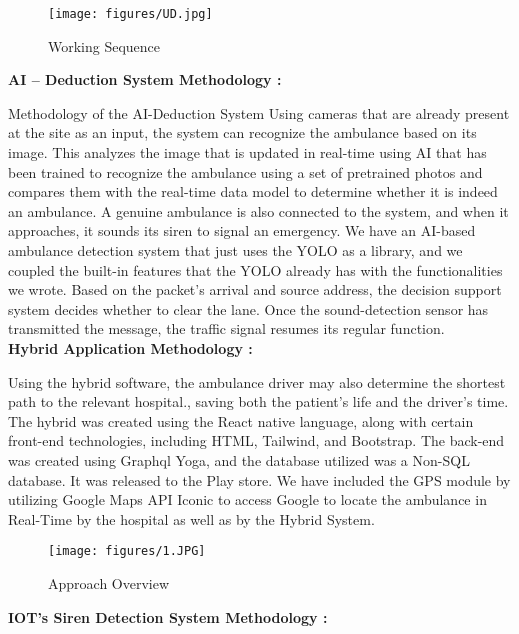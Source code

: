 \documentclass[conference]{IEEEtran}
\begin{document}
\begin{figure}
    \centering
    \texttt{[image: figures/UD.jpg]}
    \caption{Working Sequence}
    \label{fig:2}
\end{figure}

\textbf{AI – Deduction System Methodology :}

Methodology of the AI-Deduction System Using cameras that are already present at the site as an input, the system can recognize the ambulance based on its image. This analyzes the image that is updated in real-time using AI that has been trained to recognize the ambulance using a set of pretrained photos and compares them with the real-time data model to determine whether it is indeed an ambulance. A genuine ambulance is also connected to the system, and when it approaches, it sounds its siren to signal an emergency. We have an AI-based ambulance detection system that just uses the YOLO as a library, and we coupled the built-in features that the YOLO already has with the functionalities we wrote. Based on the packet's arrival and source address, the decision support system decides whether to clear the lane. Once the sound-detection sensor has transmitted the message, the traffic signal resumes its regular function. \\

\textbf{Hybrid Application Methodology : }

Using the hybrid software, the ambulance driver may also determine the shortest path to the relevant hospital., saving both the patient's life and the driver's time. The hybrid was created using the React native language, along with certain front-end technologies, including HTML, Tailwind, and Bootstrap. The back-end was created using Graphql Yoga, and the database utilized was a Non-SQL database. It was released to the Play store. We have included the GPS module by utilizing Google Maps API Iconic to access Google to locate the ambulance in Real-Time by the hospital as well as by the Hybrid System.\\ 

\begin{figure}
    \centering
    \texttt{[image: figures/1.JPG]}
    \caption{Approach Overview}
    \label{fig:2}
\end{figure}

\textbf{IOT's Siren Detection System Methodology : }
\end{document}
